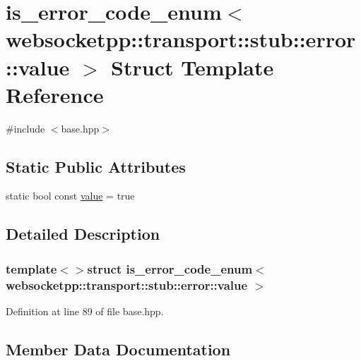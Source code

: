 \hypertarget{structis__error__code__enum_3_01websocketpp_1_1transport_1_1stub_1_1error_1_1value_01_4}{}\section{is\+\_\+error\+\_\+code\+\_\+enum$<$ websocketpp\+:\+:transport\+:\+:stub\+:\+:error\+:\+:value $>$ Struct Template Reference}
\label{structis__error__code__enum_3_01websocketpp_1_1transport_1_1stub_1_1error_1_1value_01_4}


{\ttfamily \#include $<$base.\+hpp$>$}

\subsection*{Static Public Attributes}
\begin{DoxyCompactItemize}
\item 
static bool const \hyperlink{structis__error__code__enum_3_01websocketpp_1_1transport_1_1stub_1_1error_1_1value_01_4_a48ac59af9c03585ba1f1f7b8e83a45ee}{value} = true
\end{DoxyCompactItemize}


\subsection{Detailed Description}
\subsubsection*{template$<$$>$struct is\+\_\+error\+\_\+code\+\_\+enum$<$ websocketpp\+::transport\+::stub\+::error\+::value $>$}



Definition at line 89 of file base.\+hpp.



\subsection{Member Data Documentation}
\hypertarget{structis__error__code__enum_3_01websocketpp_1_1transport_1_1stub_1_1error_1_1value_01_4_a48ac59af9c03585ba1f1f7b8e83a45ee}{}

